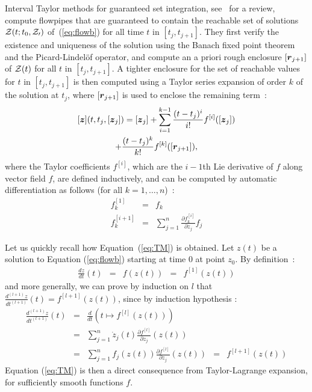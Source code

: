\documentclass{sig-alternate-05-2015}
\begin{document}
Interval Taylor methods for guaranteed set integration, see~\cite{Nedialkov99} for a review, compute flowpipes that are guaranteed
 to contain the reachable set of solutions 
${\cal Z}(t;t_0, {\cal Z_0})$ of~(\ref{eq:flowb}) for all time $t$ in $[t_j,t_{j+1}]$. They first verify the existence and uniqueness of 
the solution using the Banach fixed point theorem and the Picard-Lindel\"of operator, and compute an a priori rough enclosure $[{\r}_{j+1}]$ of 
   ${\cal Z}(t)$ for all $t$ in $[t_j,t_{j+1}]$. A tighter enclosure for the set of reachable values for $t$ in $[t_j,t_{j+1}]$ is then computed 
using a Taylor series expansion of order $k$ of the solution at $t_j$, where $[{\r}_{j+1}]$ is used to enclose the remaining term~: 
\begin{multline} 
[\z](t,t_j,[{\z}_j]) =  [{\z}_j] + \sum\limits_{i=1}^{k-1} \frac{(t-t_j)^i}{i !} f^{[i]}([{\z}_j])\\
 + \frac{(t-t_j)^k}{k !} f^{[k]}([{\r}_{j+1}]),
\label{eq:TM}
\end{multline}
where the Taylor coefficients $f^{[i]}$, which are the $i-1$th Lie derivative of $f$ along
vector field $f$, are defined inductively, and 
can be computed by automatic differentiation as follows (for all $k=1,\ldots,n$)~: 
\begin{eqnarray}
f^{[1]}_k & = & f_k \\
f^{[i+1]}_k & = & \sum\limits_{j=1}^n \frac{\partial{f^{[i]}_k}}{\partial z_j} f_j
\label{Lie1}
\end{eqnarray}

Let us quickly recall how Equation~(\ref{eq:TM}) is obtained. Let $z(t)$ be a solution to Equation (\ref{eq:flowb}) starting at
time 0 at point $z_0$. By definition~: 
$$
\begin{array}{rclcl}
\frac{d z}{d t}(t) & = & f(z(t)) & = & f^{[1]}(z(t))
\end{array}$$
\noindent and more generally, we can prove by induction on $l$ that 
$\frac{d^{(l+1)} z}{dt^{(l+1)}}(t) = f^{[l+1]}(z(t))$, 
since by induction hypothesis :
$$\begin{array}{rclcl}
\frac{d^{(l+1)} z}{dt^{(l+1)}}(t) & = & \frac{d}{dt}\left(t \mapsto
f^{[l]}(z(t))\right) \\
& = & \sum\limits_{j=1}^n \dot{z}_j(t) \frac{\partial f^{[l]}}{\partial z_j}(z(t)) \\
& = & \sum\limits_{j=1}^n f_j(z(t)) \frac{\partial f^{[l]}}{\partial z_j}(z(t)) 
& = & f^{[l+1]}(z(t))
\end{array}$$
Equation (\ref{eq:TM}) is then a direct consequence from Taylor-La\-grange expansion, for sufficiently smooth functions $f$. \\
\end{document}
